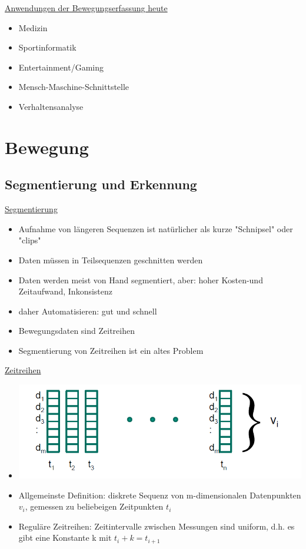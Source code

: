 \documentclass[a4paper,10pt,oneside]{article}
\begin{document}
\underline{Anwendungen der Bewegungserfassung heute} \\
	\begin{itemize}
		\item Medizin
		\item Sportinformatik
		\item Entertainment/Gaming
		\item Mensch-Maschine-Schnittstelle
		\item Verhaltensanalyse
	\end{itemize}
	
\section{Bewegung}
\subsection{Segmentierung und Erkennung}
 		
\underline{Segmentierung} \\	
	\begin{itemize}
		\item Aufnahme von längeren Sequenzen ist natürlicher als kurze "Schnipsel" oder "clips"
		\item Daten müssen in Teilsequenzen geschnitten werden
		\item Daten werden meist von Hand segmentiert, aber: hoher Kosten-und Zeitaufwand, Inkonsistenz
		\item daher Automatisieren: gut und schnell
		\item Bewegungsdaten sind Zeitreihen
		\item Segmentierung von Zeitreihen ist ein altes Problem
	\end{itemize}

\underline{Zeitreihen} \\
	\begin{itemize}
		\item[] \includegraphics[scale=0.2]{Grafiken/2304.png}
		\item Allgemeinste Definition: diskrete Sequenz von m-dimensionalen Datenpunkten $v_i$, gemessen zu beliebeigen Zeitpunkten $t_i$
		\item Reguläre Zeitreihen: Zeitintervalle zwischen Messungen sind uniform, d.h. es gibt eine Konstante k mit $t_i +k = t_{i+1}$
	\end{itemize}
	
\end{document}
